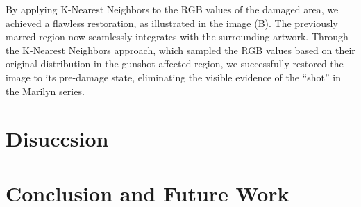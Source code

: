 \documentclass{article}
\begin{document}
By applying K-Nearest Neighbors to the RGB values of the damaged area,
we achieved a flawless restoration, as illustrated in the image (B). The
previously marred region now seamlessly integrates with the surrounding
artwork. Through the K-Nearest Neighbors approach, which sampled the RGB
values based on their original distribution in the gunshot-affected
region, we successfully restored the image to its pre-damage state,
eliminating the visible evidence of the ``shot'' in the Marilyn series.

\hypertarget{disuccsion}{%
\section{Disuccsion}\label{disuccsion}}

\hypertarget{conclusion-and-future-work}{%
\section*{Conclusion and Future Work}\label{conclusion-and-future-work}}
\end{document}
